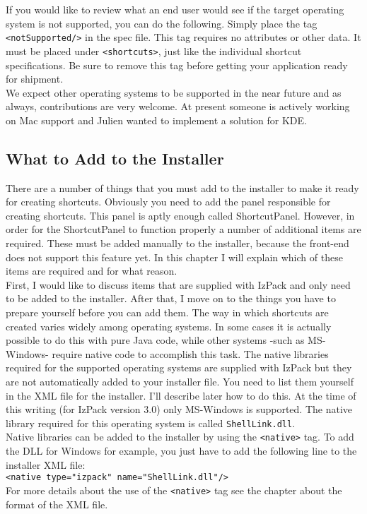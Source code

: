 If you would like to review what an end user would see if the target
operating system is not supported, you can do the following. Simply
place the tag \texttt{<notSupported/>} in the spec file. This tag requires no
attributes or other data. It must be placed under \texttt{<shortcuts>}, just like
the individual shortcut specifications. Be sure to remove this tag
before getting your application ready for shipment.\\

We expect other operating systems to be supported in the near future and
as always, contributions are very welcome. At present someone is
actively working on Mac support and  Julien wanted to implement a
solution for KDE.\\

\subsection{What to Add to the Installer}

There are a number of things that you must add to the installer to make
it ready for creating shortcuts. Obviously you need to add the panel
responsible for creating shortcuts. This panel is aptly enough called
ShortcutPanel. However, in order for the ShortcutPanel to function
properly a number of additional items are required. These must be added
manually to the installer, because the front-end does not support this
feature yet. In this chapter I will explain which of these items are
required and for what reason.\\

First, I would like to discuss items that are supplied with IzPack and
only need to be added to the installer. After that, I move on to the
things you have to prepare yourself before you can add them. The way in
which shortcuts are created varies widely among operating systems. In
some cases it is actually possible to do this with pure Java code, while
other systems -such as MS-Windows- require native code to accomplish
this task. The native libraries required for the supported operating
systems are supplied with IzPack but they are not automatically added to
your installer file. You need to list them yourself in the XML file for
the installer. I'll describe later how to do this. At the time of this
writing (for IzPack version 3.0) only MS-Windows is supported. The
native library required for this operating system is called
\texttt{ShellLink.dll}.\\

Native libraries can be added to the installer by using the
\texttt{<native>} tag. To add the DLL for Windows for example, you just
have to add the following line to the installer XML file:\\
\texttt{<native type="izpack" name="ShellLink.dll"/>}\\
For more details about the use of the \texttt{<native>} tag see the
chapter about the format of the XML file.\\

